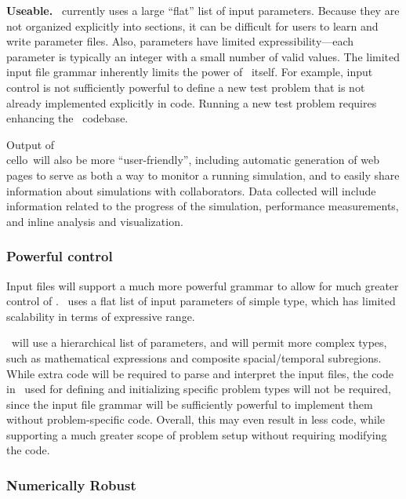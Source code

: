 \documentclass[11pt]{article}
\begin{document}


    \textbf{Useable.}  \enzo\ currently uses a large ``flat'' list of
    input parameters.  Because they are not organized explicitly into
    sections, it can be difficult for users to learn and write
    parameter files.
%
    Also, parameters have limited expressibility---each parameter is
    typically an integer with a small number of valid values.
%
    The limited input file grammar inherently limits the power of
    \enzo\ itself.  For example, input control is not sufficiently
    powerful to define a new test problem that is not already
    implemented explicitly in code.  Running a new test problem
    requires enhancing the \enzo\ codebase.

    Output of \\cello\ will also be more ``user-friendly'', including
    automatic generation of web pages to serve as both a way to
    monitor a running simulation, and to easily share information about 
    simulations with collaborators.  Data collected will include
    information related to the progress of the simulation, 
    performance measurements, and inline analysis and visualization.
% 

    \subsubsection{Powerful control}

    Input files will support a much more powerful grammar to allow for
    much greater control of \cello.  \enzo\ uses a flat list of input
    parameters of simple type, which has limited scalability in terms
    of expressive range.

    \cello\ will use a hierarchical list of parameters, and will
    permit more complex types, such as mathematical expressions and
    composite spacial/temporal subregions.  While extra code will be
    required to parse and interpret the input files, the code in
    \enzo\ used for defining and initializing specific problem types
    will not be required, since the input file grammar will be
    sufficiently powerful to implement them without problem-specific
    code.  Overall, this may even result in less code, while
    supporting a much greater scope of problem setup without requiring
    modifying the code.
    

    \subsubsection{Numerically Robust}
\end{document}
